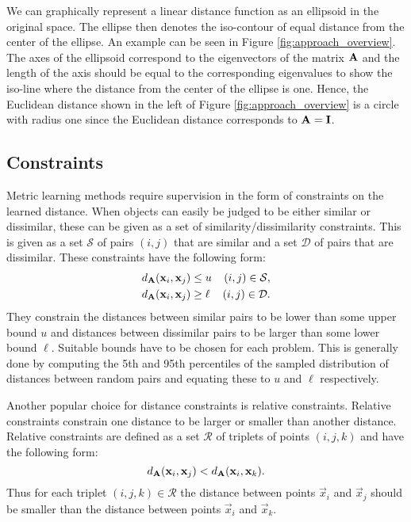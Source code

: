 We can graphically represent a linear distance function as an ellipsoid in the original space. The ellipse then denotes the iso-contour of equal distance from the center of the ellipse. An example can be seen in Figure \ref{fig:approach_overview}. The axes of the ellipsoid correspond to the eigenvectors of the matrix $\mathbf{A}$ and the length of the axis should be equal to the corresponding eigenvalues to show the iso-line where the distance from the center of the ellipse is one. Hence, the Euclidean distance shown in the left of Figure \ref{fig:approach_overview} is a circle with radius one since the Euclidean distance corresponds to $\mathbf{A} = \mathbf{I}$. 



\subsection{Constraints}

Metric learning methods require supervision in the form of constraints on the learned distance. When objects can easily be judged to be either similar or dissimilar, these can be given as a set of similarity/dissimilarity constraints. This is given as a set $\mathcal{S}$ of pairs $(i, j)$ that are similar and a set $\mathcal{D}$ of pairs that are dissimilar. These constraints have the following form:
\begin{subequations}
\begin{align}
d_{\mathbf{A}}(\mathbf{x}_i, \mathbf{x}_j) &\leq u & (i, j) \in \mathcal{S}, \\
d_{\mathbf{A}}(\mathbf{x}_i, \mathbf{x}_j) &\geq \ell & (i, j) \in \mathcal{D}.
\end{align}
\end{subequations}
They constrain the distances between similar pairs to be lower than some upper bound $u$ and distances between dissimilar pairs to be larger than some lower bound $\ell$. Suitable bounds have to be chosen for each problem. This is generally done by computing the 5th and 95th percentiles of the sampled distribution of distances between random pairs and equating these to  $u$ and $\ell$ respectively.

Another popular choice for distance constraints is relative constraints. Relative constraints constrain one distance to be larger or smaller than another distance. Relative constraints are defined as a set $\mathcal{R}$ of triplets of points $(i,j,k)$ and have the following form:
\begin{equation}
d_{\mathbf{A}}(\mathbf{x}_i, \mathbf{x}_j) < d_{\mathbf{A}}(\mathbf{x}_i, \mathbf{x}_k).
\end{equation}
Thus for each triplet $(i,j,k) \in \mathcal{R}$ the distance between points $\vec{x}_i$ and $\vec{x}_j$ should be smaller than the distance between points $\vec{x}_i$ and $\vec{x}_k$.

